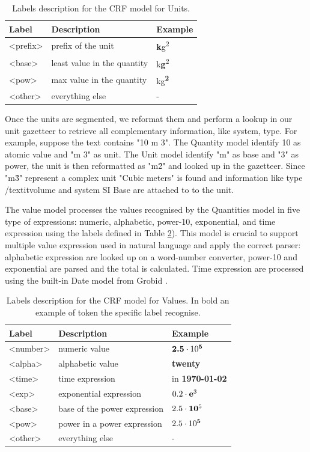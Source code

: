 \documentclass[sigconf]{acmart}
\begin{document}
\begin{table}
  \caption{Labels description for the CRF model for Units. }
  \label{tab:units-model-labels}
  \begin{tabular}{lll}
    \toprule
    Label & Description & Example\\
    \midrule
    <prefix> & prefix of the unit  & \textbf{k}g\textsuperscript{2} \\
    <base> & least value in the quantity & k\textbf{g}\textsuperscript{2}\\
    <pow> & max value in the quantity & kg\textsuperscript{\textbf{2}}\\
    <other> & everything else & - \\
  \bottomrule
\end{tabular}
\end{table}

Once the units are segmented, we reformat them and perform a lookup in our unit gazetteer to retrieve all complementary information, like system, type. For example, suppose the text contains "10 m 3". The Quantity model identify 10 as atomic value and "m 3" as unit. The Unit model identify "m" as base and "3" as power, the unit is then reformatted as "m\^2" and looked up in the gazetteer. Since "m\^3" represent a complex unit "Cubic meters" is found and information like type /textit{volume} and system SI Base are attached to to the unit. 

The value model processes the values recognised by the Quantities model in five type of expressions: numeric, alphabetic, power-10, exponential, and time expression using the labels defined in Table \ref{tab:values-model-labels}). This model is crucial to support multiple value expression used in natural language and apply the correct parser: alphabetic expression are looked up on a word-number converter, power-10 and exponential are parsed and the total is calculated. Time expression are processed using the built-in Date model from Grobid \cite{GROBID}.

\begin{table}
  \caption{Labels description for the CRF model for Values. In bold an example of token the specific label recognise.}
  \label{tab:values-model-labels}
  \begin{tabular}{lll}
    \toprule
    Label & Description & Example\\
    \midrule
    <number> & numeric value & $\textbf{2.5}\cdot10\textsuperscript{\textbf{5}}$ \\
    <alpha> & alphabetic value & \textbf{twenty} \\
    <time> & time expression  & in \textbf{1970-01-02}\\
    <exp> & exponential expression & $0.2\cdot\textbf{e}\textsuperscript{3}$ \\
    <base> & base of the power expression & $2.5\cdot\textbf{10}\textsuperscript{5}$\\
    <pow> & power in a power expression & $2.5\cdot10\textsuperscript{\textbf{5}}$ \\
    <other> & everything else & - \\
  \bottomrule
\end{tabular}
\end{table}
\end{document}
